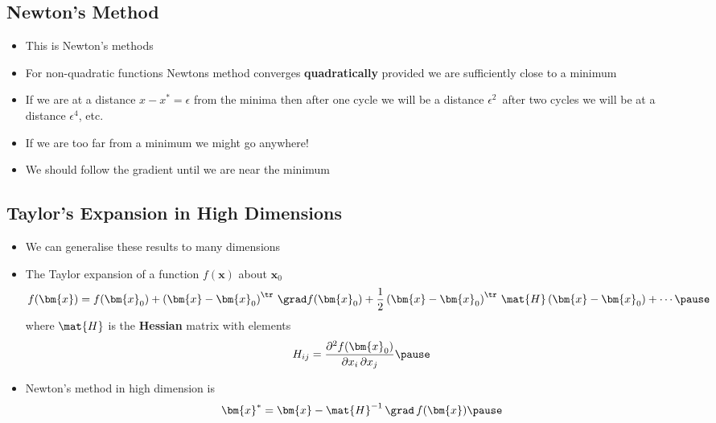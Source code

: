 \begin{slide}
\section{Newton's Method}

\begin{PauseHighLight}

\begin{itemize}
\item This is Newton's methods\pause
\item For non-quadratic functions Newtons method converges
  \textbf{quadratically} provided we are sufficiently close to a minimum\pause
\item If we are at a distance $x-x^*=\epsilon$ from the minima then after
  one cycle we will be a distance $\epsilon^2$\pause\ after two cycles we
  will be at a distance $\epsilon^4$, etc.\pause
\item If we are too far from a minimum we might go anywhere!\pause
\item We should follow the gradient until we are near the minimum\pause
\end{itemize}

\end{PauseHighLight}
\end{slide}


\begin{slide}
\section[-1.5]{Taylor's Expansion in High Dimensions}

\begin{PauseHighLight}

\begin{itemize}\squeeze
\item We can generalise these results to many dimensions\pause
\item The Taylor expansion of a function $f(\bm{x})$ about $\bm{x}_0$
  \begin{displaymath}
        f(\bm{x}) = f(\bm{x}_0) + \left(\bm{x}-\bm{x}_0\right)^\tr\,
    \grad f(\bm{x}_0) + \frac{1}{2} \left(\bm{x}-\bm{x}_0\right)^\tr\,
    \mat{H} \left(\bm{x}-\bm{x}_0\right) + \cdots\pause
  \end{displaymath}
  where $\mat{H}$ is the \textbf{Hessian} matrix with elements
  \begin{displaymath}
    H_{ij} = \frac{\partial^2 f(\bm{x}_0)}{\partial x_i \,\partial x_j}
    \pause 
  \end{displaymath}
\item Newton's method in high dimension is
  \begin{displaymath}
    \bm{x}^* = \bm{x} - \mat{H}^{-1} \, \grad \,f(\bm{x})\pause
  \end{displaymath}
\end{itemize}

\end{PauseHighLight}
\end{slide}

